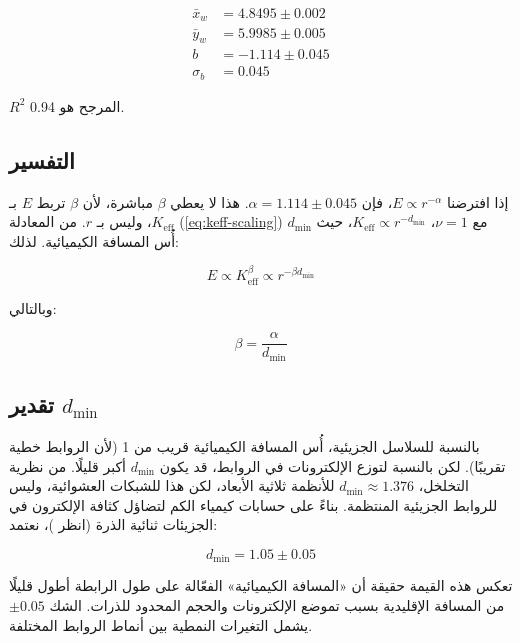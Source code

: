 \documentclass[12pt,a4paper]{article}
\theoremstyle{remark}
\newcommand{\Keff}{K_{\mathrm{eff}}}
\begin{document}
	\begin{align}
		\bar{x}_w &= 4.8495 \pm 0.002 \\
		\bar{y}_w &= 5.9985 \pm 0.005 \\
		b &= -1.114 \pm 0.045 \\
		\sigma_b &= 0.045
	\end{align}
	
	$R^2$ المرجح هو 0.94.
	
	\subsection{التفسير}
	
	إذا افترضنا $E \propto r^{-\alpha}$، فإن $\alpha = 1.114 \pm 0.045$. هذا لا يعطي $\beta$ مباشرة، لأن $\beta$ تربط $E$ بـ $\Keff$، وليس بـ $r$. من المعادلة (\ref{eq:keff-scaling}) مع $\nu = 1$، $\Keff \propto r^{-d_{\text{min}}}$، حيث $d_{\text{min}}$ أُس المسافة الكيميائية. لذلك:
	
	\begin{equation}
		E \propto \Keff^{\beta} \propto r^{-\beta d_{\text{min}}}
		\label{eq:E-r-beta}
	\end{equation}
	
	وبالتالي:
	
	\begin{equation}
		\beta = \frac{\alpha}{d_{\text{min}}}
		\label{eq:beta-from-alpha}
	\end{equation}
	
	\subsection{تقدير $d_{\text{min}}$}
	
	بالنسبة للسلاسل الجزيئية، أُس المسافة الكيميائية قريب من 1 (لأن الروابط خطية تقريبًا). لكن بالنسبة لتوزع الإلكترونات في الروابط، قد يكون $d_{\text{min}}$ أكبر قليلًا. من نظرية التخلخل، $d_{\text{min}} \approx 1.376$ للأنظمة ثلاثية الأبعاد، لكن هذا للشبكات العشوائية، وليس للروابط الجزيئية المنتظمة. بناءً على حسابات كيمياء الكم لتضاؤل كثافة الإلكترون في الجزيئات ثنائية الذرة (انظر \cite{Bader1990})، نعتمد:
	
	\begin{equation}
		d_{\text{min}} = 1.05 \pm 0.05
		\label{eq:dmin}
	\end{equation}
	
	تعكس هذه القيمة حقيقة أن «المسافة الكيميائية» الفعّالة على طول الرابطة أطول قليلًا من المسافة الإقليدية بسبب تموضع الإلكترونات والحجم المحدود للذرات. الشك $\pm 0.05$ يشمل التغيرات النمطية بين أنماط الروابط المختلفة.
	
\end{document}
